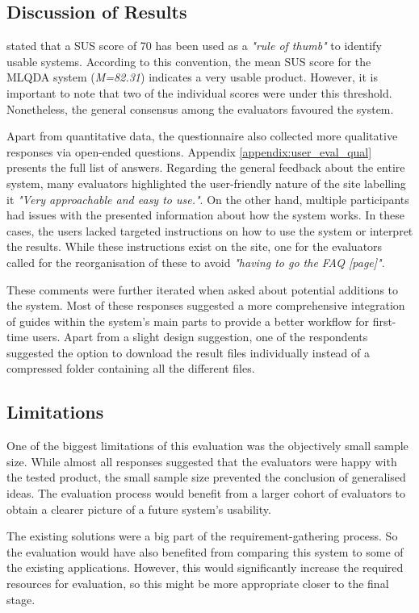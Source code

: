 \documentclass{l4proj}
\begin{document}
\subsection{Discussion of Results}
\cite{bangor2008empirical} stated that a SUS score of 70 has been used as a \textit{"rule of thumb"} to identify usable systems. According to this convention, the mean SUS score for the MLQDA system (\textit{M=82.31}) indicates a very usable product. However, it is important to note that two of the individual scores were under this threshold. Nonetheless, the general consensus among the evaluators favoured the system. 

Apart from quantitative data, the questionnaire also collected more qualitative responses via open-ended questions. Appendix \ref{appendix:user_eval_qual} presents the full list of answers. Regarding the general feedback about the entire system, many evaluators highlighted the user-friendly nature of the site labelling it \textit{"Very approachable and easy to use."}. On the other hand, multiple participants had issues with the presented information about how the system works. In these cases, the users lacked targeted instructions on how to use the system or interpret the results. While these instructions exist on the site, one for the evaluators called for the reorganisation of these to avoid \textit{"having to go the FAQ [page]"}. 

These comments were further iterated when asked about potential additions to the system. Most of these responses suggested a more comprehensive integration of guides within the system's main parts to provide a better workflow for first-time users. Apart from a slight design suggestion, one of the respondents suggested the option to download the result files individually instead of a compressed folder containing all the different files.

\subsection{Limitations}
One of the biggest limitations of this evaluation was the objectively small sample size. While almost all responses suggested that the evaluators were happy with the tested product, the small sample size prevented the conclusion of generalised ideas. The evaluation process would benefit from a larger cohort of evaluators to obtain a clearer picture of a future system's usability.

The existing solutions were a big part of the requirement-gathering process. So the evaluation would have also benefited from comparing this system to some of the existing applications. However, this would significantly increase the required resources for evaluation, so this might be more appropriate closer to the final stage.  
\end{document}
